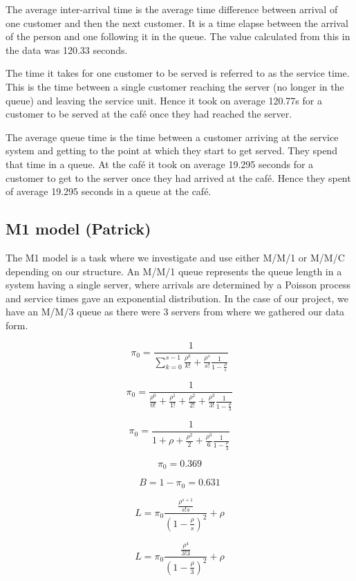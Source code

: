 \documentclass{article}
\begin{document}
The average inter-arrival time is the average time difference between arrival of one customer and then the next customer. It is a time elapse between the arrival of the person and one following it in the queue. The value calculated from this in the data was 120.33 seconds.

The time it takes for one customer to be served is referred to as the service time. This is the time between a single customer reaching the server (no longer in the queue) and leaving the service unit. Hence it took on average 120.77s for a customer to be served at the café once they had reached the server.

The average queue time is the time between a customer arriving at the service system and getting to the point at which they start to get served. They spend that time in a queue. At the café it took on average 19.295 seconds for a customer to get to the server once they had arrived at the café. Hence they spent of average 19.295 seconds in a queue at the café.




\subsection{M1 model (Patrick)}

The M1 model is a task where we investigate and use either M/M/1 or M/M/C depending on our structure. An M/M/1 queue represents the queue length in a system having a single server, where arrivals are determined by a Poisson process and service times gave an exponential distribution. In the case of our project, we have an M/M/3 queue as there were 3 servers from where we gathered our data form.

$$
\pi_{0} = \frac{1}{\sum_{k=0}^{s-1}{\frac{\rho^k}{k!}} + \frac{\rho^s}{s!}\frac{1}{1-\frac{\rho}{s}}}
$$

$$
\pi_{0} = \frac{1}{\frac{\rho^0}{0!} + \frac{\rho^1}{1!} + \frac{\rho^2}{2!} + \frac{\rho^3}{3!}\frac{1}{1-\frac{\rho}{3}}}
$$

$$
\pi_{0} = \frac{1}{1 + \rho + \frac{\rho^2}{2} + \frac{\rho^3}{6}\frac{1}{1-\frac{\rho}{3}}}
$$

$$
\pi_{0} = 0.369
$$

$$
B = 1-\pi_{0} = 0.631
$$

$$
L = \pi_{0}\frac{\frac{\rho^{s+1}}{s!s}}{(1-\frac{\rho}{s})^2}+\rho
$$

$$
L = \pi_{0}\frac{\frac{\rho^{4}}{3!3}}{(1-\frac{\rho}{3})^2}+\rho
$$
\end{document}
